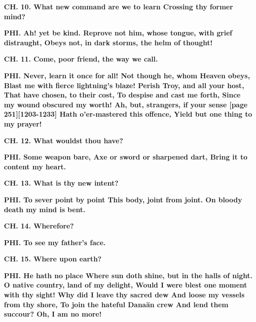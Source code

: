 \documentclass[11pt,letter]{book}
\begin{document}
\par \textbf{CH. 10. What new command are we to learn Crossing thy former mind?}
\par 

\par \textbf{PHI. Ah! yet be kind. Reprove not him, whose tongue, with grief distraught, Obeys not, in dark storms, the helm of thought!}
\par 

\par \textbf{CH. 11. Come, poor friend, the way we call.}
\par 

\par \textbf{PHI. Never, learn it once for all! Not though he, whom Heaven obeys, Blast me with fierce lightning’s blaze! Perish Troy, and all your host, That have chosen, to their cost, To despise and cast me forth, Since my wound obscured my worth! Ah, but, strangers, if your sense [page 251][1203-1233] Hath o’er-mastered this offence, Yield but one thing to my prayer!}
\par 

\par \textbf{CH. 12. What wouldst thou have?}
\par 

\par \textbf{PHI. Some weapon bare, Axe or sword or sharpened dart, Bring it to content my heart.}
\par 

\par \textbf{CH. 13. What is thy new intent?}
\par 

\par \textbf{PHI. To sever point by point This body, joint from joint. On bloody death my mind is bent.}
\par 

\par \textbf{CH. 14. Wherefore?}
\par 

\par \textbf{PHI. To see my father’s face.}
\par 

\par \textbf{CH. 15. Where upon earth?}
\par 

\par \textbf{PHI. He hath no place Where sun doth shine, but in the halls of night. O native country, land of my delight, Would I were blest one moment with thy sight! Why did I leave thy sacred dew And loose my vessels from thy shore, To join the hateful Danaän crew And lend them succour? Oh, I am no more!}
\par 
\end{document}

